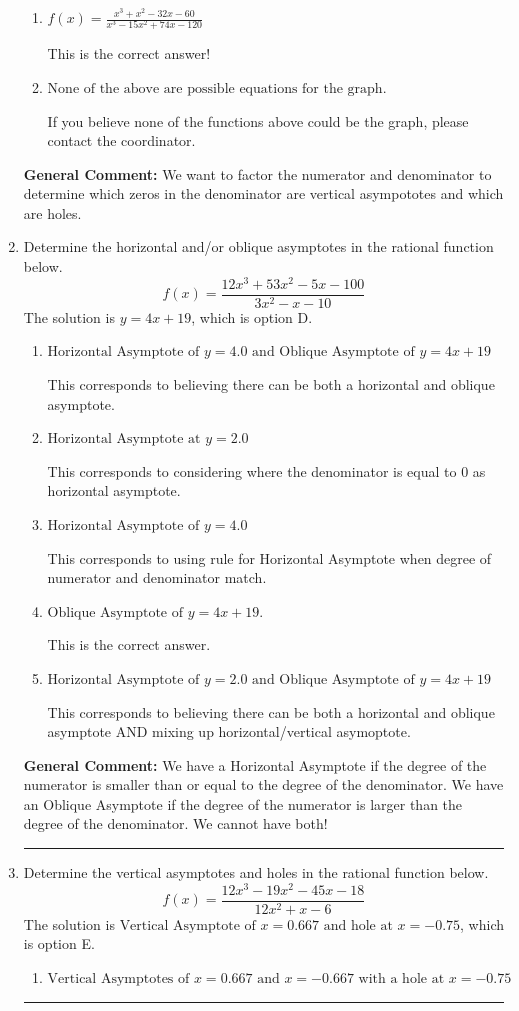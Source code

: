 \documentclass{extbook}[14pt]
\newcommand{\litem}[1]{\item #1

\rule{\textwidth}{0.4pt}}
\begin{document}
\begin{enumerate}
{\begin{enumerate}[label=\Alph*.]
Remember that factors are written as $x-z$. For example, the zero $x=4$ corresponds to the factor $x-(4)$.
\item \( f(x)=\frac{x^{3} + x^{2} -32 x -60}{x^{3} -15 x^{2} +74 x -120} \)

This is the correct answer!
\item \( \text{None of the above are possible equations for the graph.} \)

If you believe none of the functions above could be the graph, please contact the coordinator.
\end{enumerate}

\textbf{General Comment:} We want to factor the numerator and denominator to determine which zeros in the denominator are vertical asympototes and which are holes.
}
\litem{
Determine the horizontal and/or oblique asymptotes in the rational function below.
\[ f(x) = \frac{12x^{3} +53 x^{2} -5 x -100}{3x^{2} -x -10} \]The solution is \( y = 4x + 19 \), which is option D.\begin{enumerate}[label=\Alph*.]
\item \( \text{Horizontal Asymptote of } y = 4.0 \text{ and Oblique Asymptote of } y = 4x + 19 \)

This corresponds to believing there can be both a horizontal and oblique asymptote.
\item \( \text{Horizontal Asymptote at } y = 2.0 \)

This corresponds to considering where the denominator is equal to 0 as horizontal asymptote.
\item \( \text{Horizontal Asymptote of } y = 4.0  \)

This corresponds to using rule for Horizontal Asymptote when degree of numerator and denominator match.
\item \( \text{Oblique Asymptote of } y = 4x + 19. \)

This is the correct answer.
\item \( \text{Horizontal Asymptote of } y = 2.0 \text{ and Oblique Asymptote of } y = 4x + 19 \)

This corresponds to believing there can be both a horizontal and oblique asymptote AND mixing up horizontal/vertical asymoptote.
\end{enumerate}

\textbf{General Comment:} We have a Horizontal Asymptote if the degree of the numerator is smaller than or equal to the degree of the denominator. We have an Oblique Asymptote if the degree of the numerator is larger than the degree of the denominator. We cannot have both!
}
\litem{
Determine the vertical asymptotes and holes in the rational function below.
\[ f(x) = \frac{12x^{3} -19 x^{2} -45 x -18}{12x^{2} +x -6} \]The solution is \( \text{Vertical Asymptote of } x = 0.667 \text{ and hole at } x = -0.75 \), which is option E.\begin{enumerate}[label=\Alph*.]
\item \( \text{Vertical Asymptotes of } x = 0.667 \text{ and } x = -0.667 \text{ with a hole at } x = -0.75 \)


\end{enumerate}}
\end{enumerate}
\end{document}
